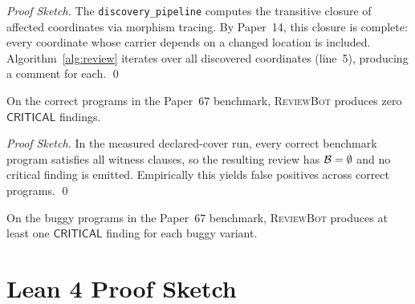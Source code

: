 \documentclass[11pt]{article}
\newcommand{\ReviewBot}{\textsc{ReviewBot}}
\newcommand{\SevCritical}{\mathsf{CRITICAL}}
\begin{document}
\begin{proof}[Proof Sketch]
The \texttt{discovery\_pipeline} computes the transitive closure of affected
coordinates via morphism tracing. By Paper~14, this closure is complete:
every coordinate whose carrier depends on a changed location is included.
Algorithm~\ref{alg:review} iterates over all discovered coordinates (line~5),
producing a comment for each. \qed
\end{proof}

\begin{proposition}\label{thm:no-fp}
On the \ppLXVIIcorrectCount{} correct programs in the Paper~67 benchmark,
\ReviewBot{} produces zero $\SevCritical$ findings.
\end{proposition}

\begin{proof}[Proof Sketch]
In the measured declared-cover run, every correct benchmark program satisfies
all witness clauses, so the resulting review has $\mathcal{B} = \emptyset$ and no
critical finding is emitted. Empirically this yields
\ppLXVIIfpCount{} false positives across \ppLXVIIcorrectCount{} correct
programs. \qed
\end{proof}

\begin{corollary}
On the \ppLXVIIbuggyCount{} buggy programs in the Paper~67 benchmark,
\ReviewBot{} produces at least one $\SevCritical$ finding for each buggy
variant.
\end{corollary}

\section{Lean 4 Proof Sketch}\label{sec:lean}
\end{document}
